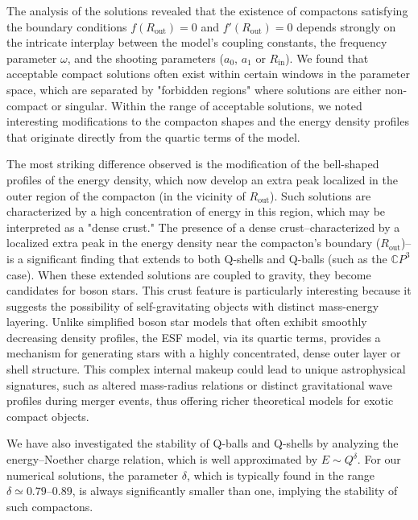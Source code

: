\documentclass[aps,prd,superscriptaddress,notitlepage,11pt,final,longbibliography,nofootinbib]{revtex4-1}
\numberwithin{equation}{section}
\begin{document}
The analysis of the solutions revealed that the existence of compactons satisfying the boundary conditions $f(R_{\text{out}})=0$ and $f'(R_{\text{out}})=0$ depends strongly on the intricate interplay between the model's coupling constants, the frequency parameter $\omega$, and the shooting parameters ($a_0$,  $a_1$ or $R_{\text {in}}$). We found that acceptable compact solutions often exist within certain windows in the parameter space, which are separated by "forbidden regions" where solutions are either non-compact or singular. Within the range of acceptable solutions, we noted interesting modifications to the compacton shapes and the energy density profiles that originate directly from the quartic terms of the model. 

The most striking difference observed is the modification of the bell-shaped profiles of the energy density, which now develop an extra peak localized in the outer region of the compacton (in the vicinity of $R_{\text{out}}$). Such solutions are characterized by a high concentration of energy in this region, which may be interpreted as a "dense crust."
The presence of a dense crust--characterized by a localized extra peak in the energy density near the compacton's boundary ($R_{\text{out}}$)--is a significant finding that extends to both Q-shells and Q-balls (such as the $\mathbb{C}P^3$ case). When these extended solutions are coupled to gravity, they become candidates for boson stars. This crust feature is particularly interesting because it suggests the possibility of self-gravitating objects with distinct mass-energy layering. Unlike simplified boson star models that often exhibit smoothly decreasing density profiles, the ESF model, via its quartic terms, provides a mechanism for generating stars with a highly concentrated, dense outer layer or shell structure. This complex internal makeup could lead to unique astrophysical signatures, such as altered mass-radius relations or distinct gravitational wave profiles during merger events, thus offering richer theoretical models for exotic compact objects.

We have also investigated the stability of Q-balls and Q-shells by analyzing the energy--Noether charge relation, which is well approximated by $E \sim Q^{\delta}$. For our numerical solutions, the parameter $\delta$, which is typically found in the range $\delta \simeq 0.79\text{--}0.89$, is always significantly smaller than one, implying the stability of such compactons.
\end{document}
